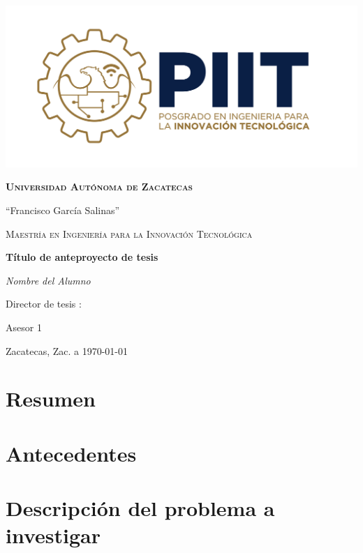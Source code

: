 \documentclass[10pt,letterpaper]{report}
\begin{document}
	\begin{titlepage}
		\centering
		\includegraphics[width=.7\textwidth]{Imagenes/Logo.png}\par\vspace{1cm}
		{\scshape\LARGE \bfseries Universidad Autónoma de Zacatecas \par 
        ``Francisco García Salinas''\par }
		\vspace{1cm}
        {\scshape\Large Maestría en Ingeniería para la Innovación Tecnológica\par}
		\vspace{1.5cm}
		{\huge\bfseries Título de anteproyecto de tesis\par}
		\vspace{2cm}
		{\Large\itshape Nombre del Alumno\par}
		\vfill
		Director de tesis :\par
		Asesor 1\par
				
		\vfill
		
		{\large Zacatecas, Zac. a \today\par}
	\end{titlepage}

\chapter*{Resumen}
          

\tableofcontents
	
\chapter{Antecedentes}

\chapter{Descripción del problema a investigar}

\end{document}
